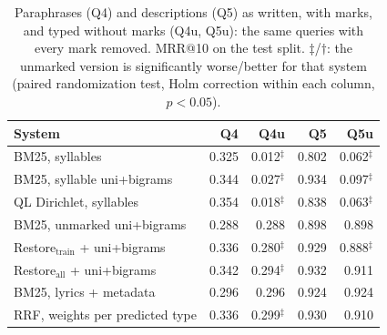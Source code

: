 \begin{table}[t]
\centering
\caption{Paraphrases (Q4) and descriptions (Q5) as written, with marks, and typed without marks (Q4u, Q5u):
the same queries with every mark removed. MRR@10 on the test split. $\ddagger$/$\dagger$: the unmarked
version is significantly worse/better for that system (paired randomization test, Holm correction within
each column, $p<0.05$).}
\label{tab:unmarked}
\small
\begin{tabular}{@{}lrrrr@{}}
\toprule
System & Q4 & Q4u & Q5 & Q5u \\
\midrule
BM25, syllables & 0.325 & 0.012$^{\ddagger}$ & 0.802 & 0.062$^{\ddagger}$ \\
BM25, syllable uni+bigrams & 0.344 & 0.027$^{\ddagger}$ & 0.934 & 0.097$^{\ddagger}$ \\
QL Dirichlet, syllables & 0.354 & 0.018$^{\ddagger}$ & 0.838 & 0.063$^{\ddagger}$ \\
BM25, unmarked uni+bigrams & 0.288 & 0.288 & 0.898 & 0.898 \\
Restore$_{\mathrm{train}}$ + uni+bigrams & 0.336 & 0.280$^{\ddagger}$ & 0.929 & 0.888$^{\ddagger}$ \\
Restore$_{\mathrm{all}}$ + uni+bigrams & 0.342 & 0.294$^{\ddagger}$ & 0.932 & 0.911 \\
BM25, lyrics + metadata & 0.296 & 0.296 & 0.924 & 0.924 \\
RRF, weights per predicted type & 0.336 & 0.299$^{\ddagger}$ & 0.930 & 0.910 \\
\bottomrule
\end{tabular}
\end{table}
